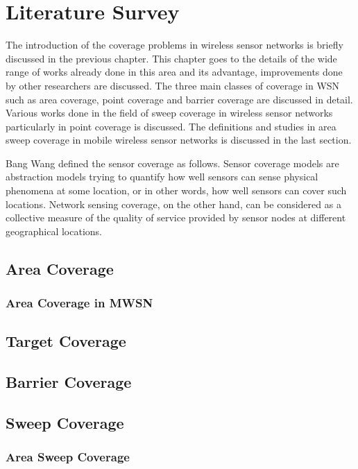 \chapter{Literature Survey}

The introduction of the coverage problems in wireless sensor networks is briefly discussed in the previous chapter. This chapter goes to the details of the wide range of works already done in this area and its advantage, improvements done by other researchers are discussed. The three main classes of coverage in WSN such as area coverage, point coverage and barrier coverage are discussed in detail. Various works done in the field of sweep coverage in wireless sensor networks particularly in point coverage is discussed. The definitions and studies in area sweep coverage in mobile wireless sensor networks is discussed in the last section.

Bang Wang \cite{wang2011coverage} defined the sensor coverage as follows. Sensor coverage models are abstraction models trying to quantify how well sensors can sense physical phenomena at some location, or in other words, how well sensors can cover such locations. Network sensing coverage, on the other hand, can be considered as a collective measure of the quality of service provided by sensor nodes at different geographical locations.

\section{Area Coverage}

\subsection{Area Coverage in MWSN}

\section{Target Coverage}

\section{Barrier Coverage}

\section{Sweep Coverage}

\subsection{Area Sweep Coverage}



%
%



